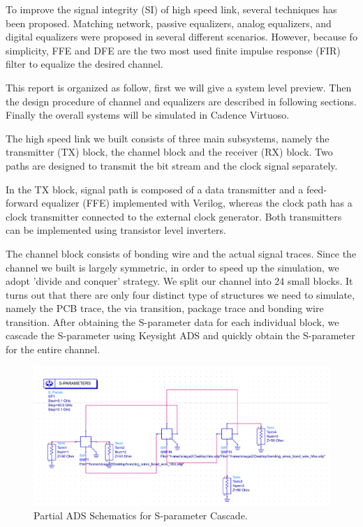 \documentclass{book}  %
\renewcommand{\section}[1]{\psection{#1}}
\begin{document}
\begin{paper}
To improve the signal integrity (SI) of high speed link, several techniques has been proposed. Matching network, passive equalizers, analog equalizers, and digital equalizers were proposed in several different scenarios. However, because fo simplicity, FFE and DFE are the two most used finite impulse response (FIR) filter to equalize the desired channel.

This report is organized as follow, first we will give a system level preview. Then the design procedure of channel and equalizers are described in following sections. Finally the overall systems will be simulated in Cadence Virtuoso. 


\section{System Level Design}
\label{sec:system}
The high speed link we built consists of three main subsystems, namely the transmitter (TX) block, the channel block and the receiver (RX) block. Two paths are designed to transmit the bit stream and the clock signal separately. 

In the TX block, signal path is composed of a data transmitter and a feed-forward equalizer (FFE) implemented with Verilog, whereas the clock path has a clock transmitter connected to the external clock generator. Both transmitters can be implemented using transistor level inverters.

The channel block consists of bonding wire and the actual signal traces. Since the channel we built is largely symmetric, in order to speed up the simulation, we adopt 'divide and conquer' strategy. We split our channel into 24 small blocks. It turns out that there are only four distinct type of structures we need to simulate, namely the PCB trace, the via transition, package trace and bonding wire transition. After obtaining the S-parameter data for each individual block, we cascade the S-parameter using Keysight ADS and quickly obtain the S-parameter for the entire channel. 

\begin{figure}[htbp!]
	\centering
	\includegraphics[width=0.8\columnwidth]{./img/cascade_schematics.png}
	\caption{Partial ADS Schematics for S-parameter Cascade.}
\end{figure}


\end{paper}
\end{document}
